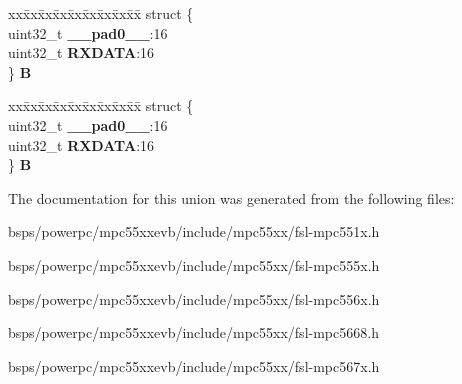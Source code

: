 \begin{DoxyCompactItemize}
\begin{tabbing}
\end{tabbing}\item 
\mbox{\label{unionDSPI__tag_1_1DSPI__POPR__tag_aa98cc109d3c992132a443a3fdc98cfaf}} 
\begin{tabbing}
xx\=xx\=xx\=xx\=xx\=xx\=xx\=xx\=xx\=\kill
struct \{\\
\>uint32\_t {\bfseries \_\_pad0\_\_}:16\\
\>uint32\_t {\bfseries RXDATA}:16\\
\} {\bfseries B}\\

\end{tabbing}\item 
\mbox{\label{unionDSPI__tag_1_1DSPI__POPR__tag_a40c47c68e28a1569e7ed398d42fdb3bf}} 
\begin{tabbing}
xx\=xx\=xx\=xx\=xx\=xx\=xx\=xx\=xx\=\kill
struct \{\\
\>uint32\_t {\bfseries \_\_pad0\_\_}:16\\
\>uint32\_t {\bfseries RXDATA}:16\\
\} {\bfseries B}\\

\end{tabbing}\end{DoxyCompactItemize}


The documentation for this union was generated from the following files\+:\begin{DoxyCompactItemize}
\item 
bsps/powerpc/mpc55xxevb/include/mpc55xx/fsl-\/mpc551x.\+h\item 
bsps/powerpc/mpc55xxevb/include/mpc55xx/fsl-\/mpc555x.\+h\item 
bsps/powerpc/mpc55xxevb/include/mpc55xx/fsl-\/mpc556x.\+h\item 
bsps/powerpc/mpc55xxevb/include/mpc55xx/fsl-\/mpc5668.\+h\item 
bsps/powerpc/mpc55xxevb/include/mpc55xx/fsl-\/mpc567x.\+h\end{DoxyCompactItemize}
